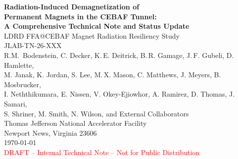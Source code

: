 \documentclass[11pt,letterpaper]{article}
\begin{document}
\begin{titlepage}
\centering
\vspace*{2cm}
{\huge\bfseries Radiation-Induced Demagnetization of\\
Permanent Magnets in the CEBAF Tunnel:\\[6pt]
A Comprehensive Technical Note and Status Update}\\[1.5cm]
{\Large LDRD FFA@CEBAF Magnet Radiation Resiliency Study\\JLAB-TN-26-XXX}\\[2cm]
{\large R.M.\ Bodenstein, C. Decker, K.\,E. Deitrick, B.\,R. Gamage, J.\,F. Gubeli, D. Hamlette,\\ M. Janak, K. Jordan, S. Lee, M.\,X. Mason, C. Matthews, J. Meyers, B. Mosbrucker,\\ I. Neththikumara,  E. Nissen, V. Okey-Ejiowhor, A. Ramirez, D. Thomas, J. Samari,\\ S. Shriner, M. Smith, N. Wilson, and External Collaborators}\\[2.5cm]
{\large Thomas Jefferson National Accelerator Facility}\\[0.5cm]
{\large Newport News, Virginia 23606}\\[3cm]
{\large\today}\\[1.5cm]
{\large\textcolor{red}{DRAFT -- Internal Technical Note -- Not for Public Distribution}}\\[2cm]


\end{titlepage}
\end{document}
